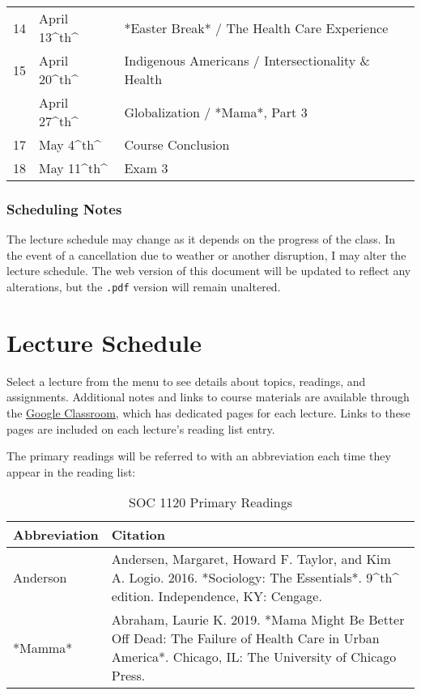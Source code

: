 \documentclass[]{book}
\begin{document}
\begin{table}
\begin{tabular}[t]{lll}
14 & April 13\textasciicircum{}th\textasciicircum{} & *Easter Break* / The Health Care Experience\\
15 & April 20\textasciicircum{}th\textasciicircum{} & Indigenous Americans / Intersectionality \& Health\\
\addlinespace
16 & April 27\textasciicircum{}th\textasciicircum{} & Globalization / *Mama*, Part 3\\
17 & May 4\textasciicircum{}th\textasciicircum{} & Course Conclusion\\
18 & May 11\textasciicircum{}th\textasciicircum{} & Exam 3\\
\bottomrule
\end{tabular}
\end{table}

\hypertarget{scheduling-notes}{%
\subsection{Scheduling Notes}\label{scheduling-notes}}

The lecture schedule may change as it depends on the progress of the class. In the event of a cancellation due to weather or another disruption, I may alter the lecture schedule. The web version of this document will be updated to reflect any alterations, but the \texttt{.pdf} version will remain unaltered.

\hypertarget{lecture-schedule}{%
\chapter{Lecture Schedule}\label{lecture-schedule}}

Select a lecture from the menu to see details about topics, readings, and assignments. Additional notes and links to course materials are available through the \href{https://classroom.google.com}{Google Classroom}, which has dedicated pages for each lecture. Links to these pages are included on each lecture's reading list entry.

The primary readings will be referred to with an abbreviation each time they appear in the reading list:

\begin{table}

\caption{\label{tab:unnamed-chunk-1}SOC 1120 Primary Readings}
\centering
\begin{tabular}[t]{ll}
\toprule
Abbreviation & Citation\\
\midrule
Anderson & Andersen, Margaret, Howard F. Taylor, and Kim A. Logio. 2016. *Sociology: The Essentials*. 9\textasciicircum{}th\textasciicircum{} edition. Independence, KY: Cengage.\\
*Mamma* & Abraham, Laurie K. 2019. *Mama Might Be Better Off Dead: The Failure of Health Care in Urban America*. Chicago, IL: The University of Chicago Press.\\
\bottomrule
\end{tabular}
\end{table}
\end{document}
